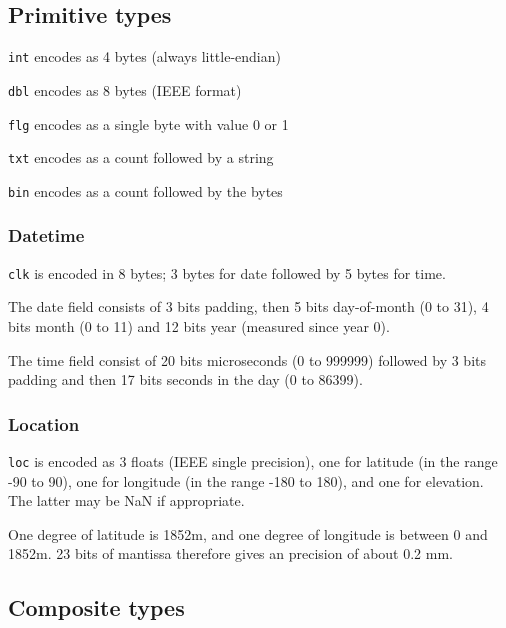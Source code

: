\documentclass[12pt,a4paper,twoside]{article}
\renewcommand{\_}{\texttt{\symbol{95}}}
\begin{document}
\subsection{Primitive types}

\begin{bulletlist}
\item \verb^int^ encodes as 4 bytes (always little-endian)
\item \verb^dbl^ encodes as 8 bytes (IEEE format)
\item \verb^flg^ encodes as a single byte with value 0 or 1
\item \verb^txt^ encodes as a count followed by a string
\item \verb^bin^ encodes as a count followed by the bytes
\end{bulletlist}

\subsubsection*{Datetime}

\verb^clk^ is encoded in 8 bytes; 3 bytes for date
followed by 5 bytes for time.

The date field consists of 3 bits padding, then 5 bits day-of-month (0 to 31),
4 bits month (0 to 11) and 12 bits year (measured since year 0).

The time field consist of 20 bits microseconds (0 to 999999) followed
by 3 bits padding and then 17 bits seconds in the day (0 to 86399).

\subsubsection*{Location}

\verb^loc^ is encoded as 3 floats (IEEE single precision),
one for latitude (in the range -90 to 90), one for longitude
(in the range -180 to 180), and one for elevation.
The latter may be NaN if appropriate.

One degree of latitude is 1852m, and one degree of longitude is
between 0 and 1852m. 23 bits of mantissa therefore gives an
precision of about 0.2 mm.

\subsection{Composite types}
\end{document}
